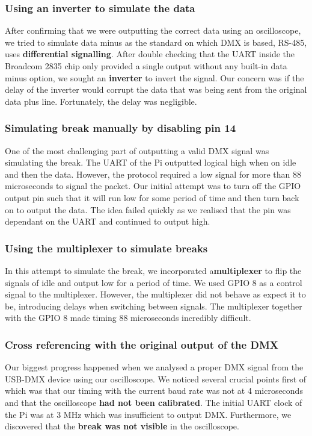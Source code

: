 \documentclass[11pt,a4paper]{article}
\begin{document}
\subsubsection{Using an inverter to simulate the data}
After confirming that we were outputting the correct data using an oscilloscope, we tried to simulate data minus as the standard on which DMX is based, RS-485, uses \textbf{differential signalling}. After double checking that the UART inside the Broadcom 2835 chip only provided a single output without any built-in data minus option, we sought an \textbf{inverter} to invert the signal. Our concern was if the delay of the inverter would corrupt the data that was being sent from the original data plus line. Fortunately, the delay was negligible.

\subsubsection{Simulating break manually by disabling pin 14}
One of the most challenging part of outputting a valid DMX signal was simulating the break. The UART of the Pi outputted logical high when on idle and then the data. However, the protocol required a low signal for more than 88 microseconds to signal the packet. Our initial attempt was to turn off the GPIO output pin such that it will run low for some period of time and then turn back on to output the data. The idea failed quickly as we realised that the pin was dependant on the UART and continued to output high.

\newpage
\subsubsection{Using the multiplexer to simulate breaks}
In this attempt to simulate the break, we incorporated a\textbf{multiplexer} to flip the signals of idle and output low for a period of time. We used GPIO 8 as a control signal to the multiplexer. However, the multiplexer did not behave as expect it to be, introducing delays when switching between signals. The multiplexer together with the GPIO 8 made timing 88 microseconds incredibly difficult.

\subsubsection{Cross referencing with the original output of the DMX}
Our biggest progress happened when we analysed a proper DMX signal from the USB-DMX device using our oscilloscope. We noticed several crucial points first of which was that our timing with the current baud rate was not at 4 microseconds and that the oscilloscope \textbf{had not been calibrated}. The initial UART clock of the Pi was at 3 MHz which was insufficient to output DMX. Furthermore, we discovered that the \textbf{break was not visible} in the oscilloscope.
\end{document}
